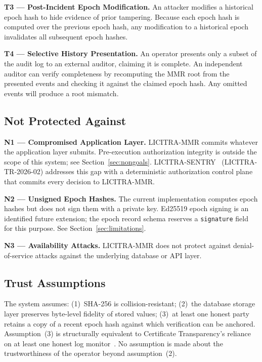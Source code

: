 \documentclass{article}
\begin{document}
\textbf{T3 --- Post-Incident Epoch Modification.} An attacker modifies a
historical epoch hash to hide evidence of prior tampering. Because each epoch
hash is computed over the previous epoch hash, any modification to a historical
epoch invalidates all subsequent epoch hashes.

\textbf{T4 --- Selective History Presentation.} An operator presents only a
subset of the audit log to an external auditor, claiming it is complete. An
independent auditor can verify completeness by recomputing the MMR root from the
presented events and checking it against the claimed epoch hash. Any omitted
events will produce a root mismatch.

\subsection{Not Protected Against}

\textbf{N1 --- Compromised Application Layer.} LICITRA-MMR commits whatever the
application layer submits. Pre-execution authorization integrity is outside the
scope of this system; see Section~\ref{sec:nongoals}.
LICITRA-SENTRY~\cite{licitrasentry} (LICITRA-TR-2026-02) addresses this gap with a
deterministic authorization control plane that commits every decision to LICITRA-MMR.

\textbf{N2 --- Unsigned Epoch Hashes.} The current implementation computes epoch
hashes but does not sign them with a private key. Ed25519 epoch signing is an
identified future extension; the epoch record schema reserves a
\texttt{signature} field for this purpose. See Section~\ref{sec:limitations}.

\textbf{N3 --- Availability Attacks.} LICITRA-MMR does not protect against
denial-of-service attacks against the underlying database or API layer.

\subsection{Trust Assumptions}

The system assumes: (1)~SHA-256 is collision-resistant; (2)~the database storage
layer preserves byte-level fidelity of stored values; (3)~at least one honest
party retains a copy of a recent epoch hash against which verification can be
anchored. Assumption~(3) is structurally equivalent to Certificate
Transparency's reliance on at least one honest log monitor~\cite{laurie2013}.
No assumption is made about the trustworthiness of the operator beyond
assumption~(2).
\end{document}
